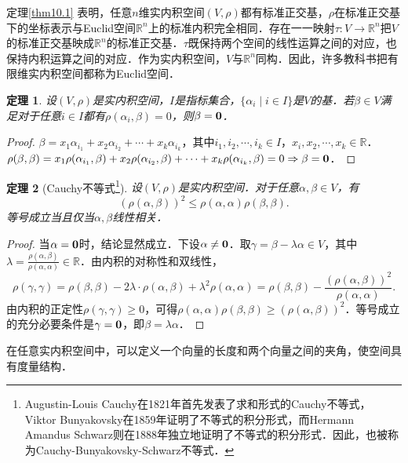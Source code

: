 \documentclass[a4paper,fontset=windows]{ctexbook}
\newtheorem{theorem}{定理}[chapter]
\theoremstyle{definition}
\renewcommand{\le}{\leqslant}
\renewcommand{\ge}{\geqslant}
\begin{document}
定理\ref{thm10.1} 表明，任意$n$维实内积空间$(V,\rho)$都有标准正交基，$\rho$在标准正交基下的坐标表示与Euclid空间$\mathbb{R}^n$上的标准内积完全相同．存在一一映射$\tau:V\to\mathbb{R}^n$把$V$的标准正交基映成$\mathbb{R}^n$的标准正交基．$\tau$既保持两个空间的线性运算之间的对应，也保持内积运算之间的对应．作为实内积空间，$V$与$\mathbb{R}^n$同构．因此，许多教科书把有限维实内积空间都称为Euclid空间．

\begin{theorem}
设$(V,\rho)$是实内积空间，$I$是指标集合，$\{\alpha_i\mid i\in I\}$是$V$的基．若$\beta\in V$满足对于任意$i\in I$都有$\rho(\alpha_i,\beta)=0$，则$\beta={\bf 0}$．
\end{theorem}

\begin{proof}
$\beta=x_1\alpha_{i_1}+x_2\alpha_{i_2}+\cdots+x_k\alpha_{i_k}$，其中$i_1,i_2,\cdots,i_k\in I$，$x_i,x_2,\cdots,x_k\in\mathbb{R}$．$\rho(\beta,\beta)=x_1\rho(\alpha_{i_1},\beta)+x_2\rho(\alpha_{i_2},\beta)+\cdots+x_k\rho(\alpha_{i_k},\beta)=0\Rightarrow\beta={\bf 0}$．
\end{proof}

\begin{theorem}[Cauchy不等式\footnote{Augustin-Louis Cauchy在1821年首先发表了求和形式的Cauchy不等式，Viktor Bunyakovsky在1859年证明了不等式的积分形式，而Hermann Amandus Schwarz则在1888年独立地证明了不等式的积分形式．因此，也被称为Cauchy-Bunyakovsky-Schwarz不等式．}]\label{thm10.3}
设$(V,\rho)$是实内积空间．对于任意$\alpha,\beta\in V$，有
\begin{equation}\label{eq10.1}
(\rho(\alpha,\beta))^2\le\rho(\alpha,\alpha)\rho(\beta,\beta).
\end{equation}
等号成立当且仅当$\alpha,\beta$线性相关．
\end{theorem}

\begin{proof}
当$\alpha={\bf 0}$时，结论显然成立．下设$\alpha\ne{\bf 0}$．取$\gamma=\beta-\lambda\alpha\in V$，其中$\lambda=\frac{\rho(\alpha,\beta)}{\rho(\alpha,\alpha)}\in\mathbb{R}$．由内积的对称性和双线性，
$$\rho(\gamma,\gamma)=\rho(\beta,\beta)-2\lambda\cdot\rho(\alpha,\beta)+\lambda^2\rho(\alpha,\alpha)=\rho(\beta,\beta)-\frac{(\rho(\alpha,\beta))^2}{\rho(\alpha,\alpha)}.$$
由内积的正定性$\rho(\gamma,\gamma)\ge 0$，可得$\rho(\alpha,\alpha)\rho(\beta,\beta)\ge(\rho(\alpha,\beta))^2$．等号成立的充分必要条件是$\gamma={\bf 0}$，即$\beta=\lambda\alpha$．
\end{proof}

在任意实内积空间中，可以定义一个向量的长度和两个向量之间的夹角，使空间具有度量结构．
\end{document}
